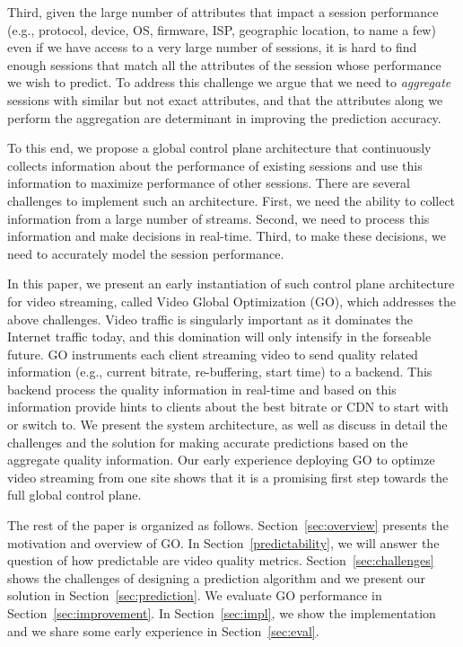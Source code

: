 Third, given the large number of attributes that impact a session performance (e.g., protocol, device, OS, firmware, ISP, geographic location, to name a few) even if we have access to a very large number of sessions, it is hard to find enough sessions that match all the attributes of the session whose performance we wish to predict. To address this challenge we argue that we need to \emph{aggregate} sessions with similar but not exact attributes, and that the attributes along we perform the aggregation are determinant in improving the prediction accuracy.

To this end, we propose a global control plane architecture that continuously collects information about the performance of existing sessions and use this information to maximize performance of other sessions. There are several challenges to implement such an architecture. First, we need the ability to collect information from a large number of streams. Second, we need to process this information and make decisions in real-time. Third, to make these decisions, we need to accurately model the session performance. 


In this paper, we present an early instantiation of such control plane architecture for video streaming, called Video Global Optimization (GO), which addresses the above challenges.  Video traffic is singularly important as it dominates the Internet traffic today, and this domination will only intensify in the forseable future. GO instruments each client streaming video to send quality related information (e.g., current bitrate, re-buffering, start time) to a backend. This backend process the quality information in real-time and based on this information provide hints to clients about the best bitrate or CDN to start with or switch to. We present the system architecture, as well as discuss in detail the challenges and the solution for making accurate predictions based on the aggregate quality information. Our early experience deploying GO to optimze video streaming from one site shows that it is a promising first step towards the full global control plane. 
   
The rest of the paper is organized as follows. Section~\ref{sec:overview} presents the motivation and overview of GO. In Section~\ref{predictability}, we will answer the question of how predictable are video quality metrics. Section~\ref{sec:challenges} shows the challenges of designing a prediction algorithm and we present our solution in Section~\ref{sec:prediction}. We evaluate GO performance in Section~\ref{sec:improvement}. In Section~\ref{sec:impl}, we show the implementation and we share some early experience in Section~\ref{sec:eval}.
